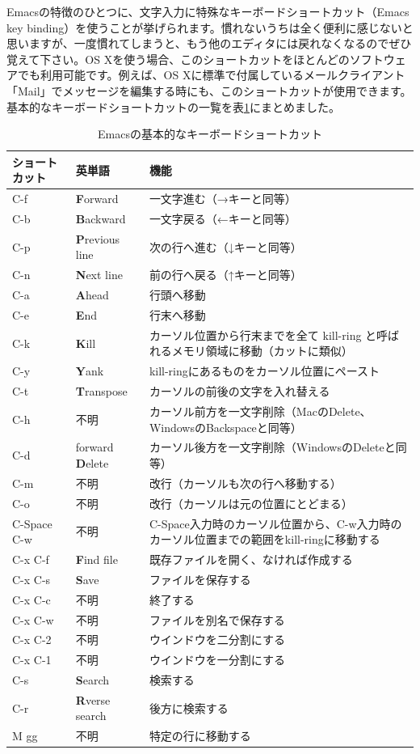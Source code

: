 Emacsの特徴のひとつに、文字入力に特殊なキーボードショートカット（Emacs key binding）を使うことが挙げられます。慣れないうちは全く便利に感じないと思いますが、一度慣れてしまうと、もう他のエディタには戻れなくなるのでぜひ覚えて下さい。OS Xを使う場合、このショートカットをほとんどのソフトウェアでも利用可能です。例えば、OS Xに標準で付属しているメールクライアント「Mail」でメッセージを編集する時にも、このショートカットが使用できます。基本的なキーボードショートカットの一覧を表\ref{tab_emacs}にまとめました。

\begin{table}
\begin{center}
\caption{Emacsの基本的なキーボードショートカット}
\label{tab_emacs}
\begin{tabular}{llp{10cm}}
\hline
ショートカット & 英単語 & 機能 \\ \hline\hline
C-f & {\bf F}orward & 一文字進む（→キーと同等） \\
C-b & {\bf B}ackward & 一文字戻る（←キーと同等） \\
C-p & {\bf P}revious line & 次の行へ進む（↓キーと同等） \\
C-n & {\bf N}ext line & 前の行へ戻る（↑キーと同等） \\
C-a & {\bf A}head & 行頭へ移動 \\
C-e & {\bf E}nd & 行末へ移動 \\
C-k & {\bf K}ill & カーソル位置から行末までを全て kill-ring と呼ばれるメモリ領域に移動（カットに類似） \\
C-y & {\bf Y}ank & kill-ringにあるものをカーソル位置にペースト \\
C-t & {\bf T}ranspose & カーソルの前後の文字を入れ替える \\
C-h & 不明 & カーソル前方を一文字削除（MacのDelete、WindowsのBackspaceと同等） \\
C-d & forward {\bf D}elete & カーソル後方を一文字削除（WindowsのDeleteと同等） \\
C-m & 不明 & 改行（カーソルも次の行へ移動する） \\
C-o & 不明 & 改行（カーソルは元の位置にとどまる） \\
C-Space C-w & 不明 & C-Space入力時のカーソル位置から、C-w入力時のカーソル位置までの範囲をkill-ringに移動する \\ \hline
C-x C-f & {\bf F}ind file & 既存ファイルを開く、なければ作成する \\
C-x C-s & {\bf S}ave & ファイルを保存する \\
C-x C-c & 不明 & 終了する \\
C-x C-w & 不明 & ファイルを別名で保存する \\
C-x C-2 & 不明 & ウインドウを二分割にする \\
C-x C-1 & 不明 & ウインドウを一分割にする \\
C-s & {\bf S}earch & 検索する \\
C-r & {\bf R}verse search & 後方に検索する \\
M gg & 不明 & 特定の行に移動する\\\hline
\end{tabular}
\end{center}
\end{table}

